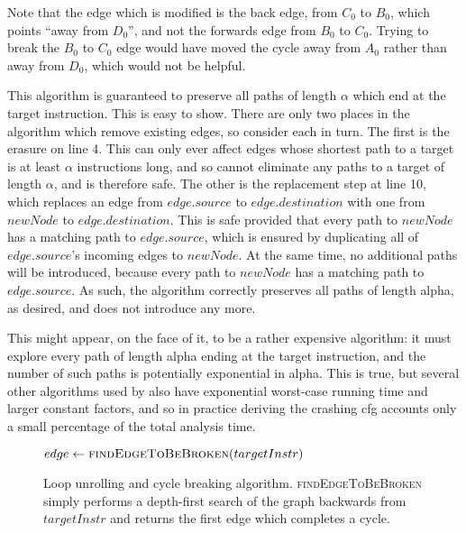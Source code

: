 Note that the edge which is modified is the back edge, from $C_0$ to
$B_0$, which points ``away from $D_0$'', and not the forwards edge
from $B_0$ to $C_0$.  Trying to break the $B_0$ to $C_0$ edge would
have moved the cycle away from $A_0$ rather than away from $D_0$,
which would not be helpful.

This algorithm is guaranteed to preserve all paths of length $\alpha$
which end at the target instruction.  This is easy to show.  There are
only two places in the algorithm which remove existing edges, so
consider each in turn.  The first is the erasure on line 4.  This can
only ever affect edges whose shortest path to a target is at least
$\alpha$ instructions long, and so cannot eliminate any paths to a
target of length $\alpha$, and is therefore safe.  The other is the
replacement step at line 10, which replaces an edge from $edge.source$
to $edge.destination$ with one from $newNode$ to $edge.destination$.
This is safe provided that every path to $newNode$ has a matching path
to $edge.source$, which is ensured by duplicating all of
$edge.source$'s incoming edges to $newNode$.  At the same time, no
additional paths will be introduced, because every path to $newNode$
has a matching path to $edge.source$.  As such, the algorithm
correctly preserves all paths of length \gls{alpha}, as desired, and
does not introduce any more.

This might appear, on the face of it, to be a rather expensive
algorithm: it must explore every path of length \gls{alpha} ending at
the target instruction, and the number of such paths is potentially
exponential in \gls{alpha}.  This is true, but several other
algorithms used by {\implementation} also have exponential worst-case
running time and larger constant factors, and so in practice deriving
the crashing \gls{cfg} accounts only a small percentage of the total
analysis time.

\begin{figure}
\begin{algorithmic}[1]
     \State $edge \gets \textsc{findEdgeToBeBroken}(targetInstr)$
     \Else
        \EndFor
     \EndIf
  \EndWhile
\end{algorithmic}
\caption{Loop unrolling and cycle breaking algorithm.
  \textsc{findEdgeToBeBroken} simply performs a depth-first search of
  the graph backwards from $targetInstr$ and returns the first edge
  which completes a cycle.}
\label{fig:derive:read:unroll_cycle_break}
\end{figure}

